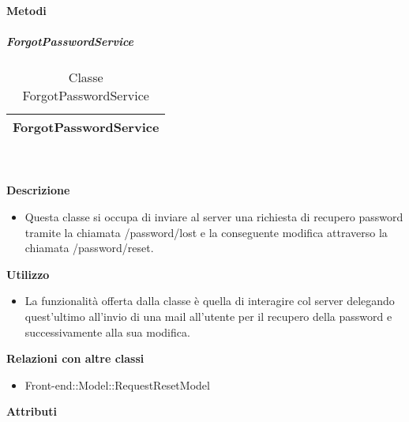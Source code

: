 		\textbf{Metodi} 
	\begin{itemize}
		\end{itemize}
			\subparagraph{ForgotPasswordService} 
\begin{table}[ht]
\begin{center}
\bgroup
	\setlength{\arrayrulewidth}{0.6mm}
	\def\arraystretch{1}
		\begin{tabular}{ | p{12cm} | }
				\hline  
					\centerline{\textbf{ForgotPasswordService}}
		\\ \hline 
				\hline
				\hline
		
		\end{tabular}
\egroup
\caption{Classe ForgotPasswordService}
\end{center}
\end{table}  \textbf{\\ \\ Descrizione} 
					\begin{itemize}
						\item[] Questa classe si occupa di inviare al server una richiesta di recupero password tramite la chiamata /password/lost e la conseguente modifica attraverso la chiamata /password/reset.
					\end{itemize}      
				\textbf{Utilizzo}  
					\begin{itemize}
						\item[] La  funzionalità offerta dalla classe è quella di interagire col server delegando quest'ultimo all'invio di una mail all'utente per il recupero della password e successivamente alla sua modifica.
					\end{itemize}
					\textbf{Relazioni con altre classi}
					\begin{itemize}
							\item{Front-end::Model::RequestResetModel}
					\end{itemize}
			 \textbf{Attributi} 
	\begin{itemize}
		\end{itemize}
		
